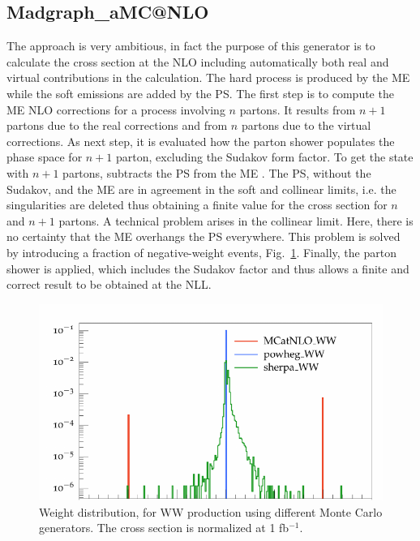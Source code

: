\subsection*{Madgraph\_aM{\footnotesize C@NLO}}
The \aMC \cite{bib:madgraph} approach is very ambitious, in fact the purpose of this generator is to calculate the cross section at the NLO including automatically both real and virtual contributions in the calculation. The  hard process is produced by the ME  while the soft emissions are added by the PS.
The first step is to compute the ME NLO corrections for a process involving $n$ partons. 
It results from  $n+1$ partons due to the real corrections and from $n$ partons due to the virtual corrections. 
As next step, it is evaluated  how the parton shower populates the phase space for $ n + 1 $ parton, excluding the Sudakov form factor. 
To get the state with $n+1$ partons, \aMC subtracts the PS  from the ME . 
The PS, without the Sudakov,  and the ME are in agreement in the soft and collinear limits, i.e. the singularities are deleted thus obtaining a finite value for the cross section for $ n $ and $ n + 1 $ partons. 
A technical problem arises in the collinear limit. Here, there is no certainty that the ME overhangs the PS everywhere. 
This problem is solved by introducing a fraction of negative-weight events, Fig.~\ref{weight}. 
Finally, the parton shower is applied, which includes the Sudakov factor and thus allows a finite and correct result to be obtained at the NLL. 
 \begin{figure}
\centering
\includegraphics[scale= 0.7]{../Cap3/Fig_MC/weight}
\caption{Weight distribution, for WW production using different Monte Carlo generators. The cross section is normalized at 1 fb$^{-1}$.}
\label{weight}
\end{figure}
 
